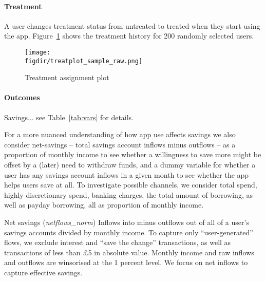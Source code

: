 \paragraph{Treatment}%
\label{par:treatment}

A user changes treatment status from untreated to treated when they start using
the app. Figure~\ref{fig:treatplot_sample_raw} shows the treatment history for
200 randomly selected users.

\begin{figure}[H]
    \centering
    \caption{Treatment assignment plot}%
    \texttt{[image: \\figdir/treatplot\_sample\_raw.png]}
    \label{fig:treatplot_sample_raw}


\end{figure}


\paragraph{Outcomes}%
\label{par:outcomes}

Savings... see Table~\ref{tab:vars} for details.

For a more nuanced understanding of how app use affects savings we also
consider net-savings -- total savings account inflows minus outflows -- as a
proportion of monthly income to see whether a willingness to save more might be
offset by a (later) need to withdraw funds, and a dummy variable for whether a
user has any savings account inflows in a given month to see whether the app
helps users save at all. To investigate possible channels, we consider total
spend, highly discretionary spend, banking charges, the total amount of
borrowing, as well as payday borrowing, all as proportion of monthly income.



Net savings (\textit{netflows\_norm})
Inflows into minus outflows out of all of a user's savings accounts divided
by monthly income. To capture only ``user-generated'' flows, we exclude
interest and ``save the change'' transactions, as well as transactions of
less than \pounds5 in absolute
value. Monthly income and raw inflows and outflows are winsorised at the 1
percent level.
We focus on net inflows to capture effective savings.


